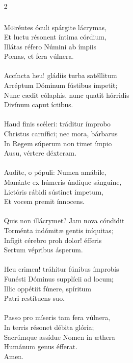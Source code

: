 \documentclass[9pt,twoside]{extarticle}
\begin{document}
\begin{multicols}{2}
\subsubsection*{\center{}}
\lettrine{M}œréntes óculi spárgite lácrymas,\\
Et luctu résonent íntima córdium,\\
Illátas réfero Númini ab ímpiis\\
Pœnas, et fera vúlnera.\\
\\
Accíncta heu! gládiis turba satéllitum\\
Arréptum Dóminum fústibus ímpetit;\\
Nunc cædit cólaphis, nunc quatit hórridis\\
Divínum caput íctibus.\\
\\
Haud finis scéleri: tráditur ímprobo\\
Christus carnífici; nec mora, bárbarus\\
In Regem súperum non timet ímpio\\
Ausu, vértere déxteram.\\
\\
Audíte, o pópuli: Numen amábile,\\
Manánte ex húmeris úndique sánguine,\\
Lictóris rábidi sústinet ímpetum,\\
Et vocem premit ínnocens.\\
\\
Quis non illácrymet? Jam nova cóndidit\\
Torménta indómitæ gentis iníquitas;\\
Infígit cérebro proh dolor! éfferis\\
Sertum vépribus ásperum.\\
\\
Heu crimen! tráhitur fúnibus ímprobis\\
Funésti Dóminus supplícii ad locum;\\
Illic oppétiit fúnere, spíritum\\
Patri restítuens suo.\\
\\
Passo pro míseris tam fera vúlnera,\\
In terris résonet débita glória;\\
Sacrúmque assídue Nomen in æthera\\
Humánum genus éfferat.\\
Amen.


\end{multicols}
\end{document}
